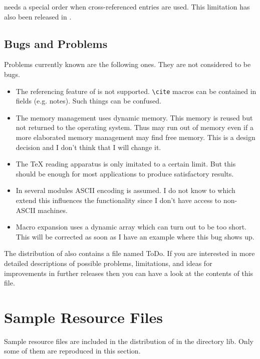 \documentclass[11pt,a4paper]{scrbook}
\makeatletter
\newcommand\file[1]{\textsf{#1}}
\let\BIBTEX\BibTeX
\renewcommand\BibTeX{\BIBTEX\index{bibtex@\BIBTEX}}
\makeatother
\begin{document}
\BibTeX{} needs a special order when cross-referenced entries are used. This
limitation has also been released in \BibTool.


\section{Bugs and Problems}

Problems currently known are the following ones. They are not considered to be
bugs.
\begin{itemize}
\item The referencing feature of \BibTeX{} is not supported. \verb|\cite|
  macros can be contained in fields (e.g. notes). Such things can be confused.
\item The memory management uses dynamic memory. This memory is reused but not
  returned to the operating system. Thus \BibTool{} may run out of memory even
  if a more elaborated memory management may find free memory. This is a
  design decision and I don't think that I will change it.
\item The \TeX{} reading apparatus is only imitated to a certain limit. But
  this should be enough for most applications to produce satisfactory results.
\item In several modules ASCII encoding is assumed. I do not know to which
  extend this influences the functionality since I don't have access to
  non-ASCII machines.
\item Macro expansion uses a dynamic array which can turn out to be too
  short. This will be corrected as soon as I have an example where this bug
  shows up. 
\end{itemize}

The distribution of \BibTool{} also contains a file named \file{ToDo}. If you
are interested in more detailed descriptions of possible problems,
limitations, and ideas for improvements in further releases then you can have
a look at the contents of this file.

\chapter{Sample Resource Files}\label{chap:resource.files}

Sample resource files are included in the distribution of \BibTool{} in the
directory \file{lib}. Only some of them are reproduced in this section.
\end{document}
